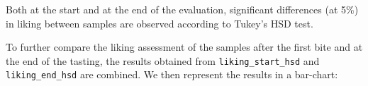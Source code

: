 \documentclass[
]{krantz}
\makeatletter
\newenvironment{Shaded}{\begin{snugshade}}{\end{snugshade}}
\newcommand{\AttributeTok}[1]{\textcolor[rgb]{0.61,0.61,0.61}{#1}}
\newcommand{\FunctionTok}[1]{\textcolor[rgb]{0,0,0}{#1}}
\newcommand{\NormalTok}[1]{#1}
\newcommand{\OtherTok}[1]{\textcolor[rgb]{0.37,0.37,0.37}{#1}}
\newcommand{\SpecialCharTok}[1]{\textcolor[rgb]{0,0,0}{#1}}
\newcommand{\StringTok}[1]{\textcolor[rgb]{0.5,0.5,0.5}{#1}}
\newenvironment{kframe}{%
\medskip{}
\setlength{\fboxsep}{.8em}
 \def\at@end@of@kframe{}%
 \ifinner\ifhmode%
  \def\at@end@of@kframe{\end{minipage}}%
  \begin{minipage}{\columnwidth}%
 \fi\fi%
 \def\FrameCommand##1{\hskip\@totalleftmargin \hskip-\fboxsep
 \colorbox{shadecolor}{##1}\hskip-\fboxsep
     \hskip-\linewidth \hskip-\@totalleftmargin \hskip\columnwidth}%
 \MakeFramed {\advance\hsize-\width
   \@totalleftmargin\z@ \linewidth\hsize
   \@setminipage}}%
 {\par\unskip\endMakeFramed%
 \at@end@of@kframe}
\renewenvironment{Shaded}{\begin{kframe}}{\end{kframe}}
\makeatother
\begin{document}
\begin{Shaded}
\end{Shaded}

Both at the start and at the end of the evaluation, significant differences (at 5\%) in liking between samples are observed according to Tukey's HSD test.

To further compare the liking assessment of the samples after the first bite and at the end of the tasting, the results obtained from \texttt{liking\_start\_hsd} and \texttt{liking\_end\_hsd} are combined. We then represent the results in a bar-chart:
\end{document}
